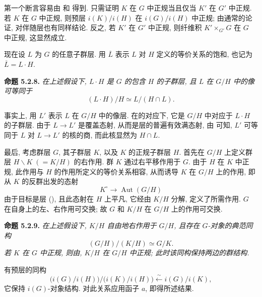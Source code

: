 第一个断言容易由
和 得到.
只需证明 \(K\) 在 \(G\) 中正规当且仅当 \(K'\) 在 \(G'\) 中正规.
若 \(K\) 在 \(G\) 中正规, 则预层 \(i(K)/i(H)\)
在 \(i(G)/i(H)\) 中正规; 由通常的论证, 对伴随层也有同样结论.
反之, 若 \(K'\) 在 \(G'\) 中正规,
则纤维积 \(K'\times_{G'}G\) 在 \(G\) 中正规, 这显然成立.

现在设 \(L\) 为 \(G\) 的任意子群层.
用 \(\overline L\) 表示 \(L\) 对 \(H\) 定义的等价关系的饱和,
也记为 \(\overline L=L\cdot H\).

\medskip
\noindent{}\textbf{命题 5.2.8.}
\textit{在上述假设下, \(L\cdot H\) 是 \(G\) 的包含 \(H\) 的子群层,
且 \(L\) 在 \(G/H\) 中的像可等同于}
\[
  (L\cdot H)/H\simeq L/(H\cap L).
\]

事实上, 用 \(L'\) 表示 \(L\) 在 \(G/H\) 中的像层.
在的对应下,
它是 \(G/H\) 中对应于 \(L\cdot H\) 的子群层.
由于 \(L\to L'\) 是覆盖态射, 从而是层的普遍有效满态射,
由 可知,
\(L'\) 可等同于 \(L\) 对 \(L\to L'\) 的核的商,
而此核显然为 \(H\cap L\).

最后, 考虑群层 \(G\), 其子群层 \(K\), 以及 \(K\) 的正规子群层 \(H\).
首先在 \(G/H\) 上定义群层 \(H\backslash K\;(=K/H)\) 的右作用.
群 \(K\) 通过右平移作用于 \(G\).
由于 \(H\) 在 \(K\) 中正规, 此作用与 \(H\) 的作用所定义的等价关系相容,
从而诱导 \(K\) 在 \(G/H\) 上的作用, 即从 \(K\) 的反群出发的态射
\[
  K^{\circ}\longrightarrow\operatorname{Aut}(G/H)
\]
由于目标是层 (),
且此态射在 \(H\) 上平凡, 它经由 \(K/H\) 分解, 定义了所需作用.
\(G\) 在自身上的左、右作用可交换;
故 \(G\) 和 \(K/H\) 在 \(G/H\) 上的作用可交换.

\medskip
\noindent{}\textbf{命题 5.2.9.}
\textit{在上述假设下, \(K/H\) 自由地右作用于 \(G/H\),
且存在 \(G\)-对象的典范同构}
\[
  (G/H)/(K/H)\simeq G/K.
\]
\textit{若 \(K\) 在 \(G\) 中正规, 则由,
\(K/H\) 在 \(G/H\) 中正规; 此时该同构保持两边的群结构.}

有预层的同构
\[
  \bigl(i(G)/i(H)\bigr)\big/\bigl(i(K)/i(H)\bigr)
  \xleftarrow{\sim} i(G)/i(K),
\]
它保持 \(i(G)\)-对象结构. 对此关系应用函子 \(a\), 即得所述结果.

